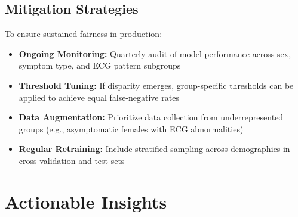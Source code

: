 \documentclass[12pt,a4paper]{article}
\begin{document}
\subsection{Mitigation Strategies}

To ensure sustained fairness in production:

\begin{itemize}
    \item \textbf{Ongoing Monitoring:} Quarterly audit of model performance across sex, symptom type, and ECG pattern subgroups
    \item \textbf{Threshold Tuning:} If disparity emerges, group-specific thresholds can be applied to achieve equal false-negative rates
    \item \textbf{Data Augmentation:} Prioritize data collection from underrepresented groups (e.g., asymptomatic females with ECG abnormalities)
    \item \textbf{Regular Retraining:} Include stratified sampling across demographics in cross-validation and test sets
\end{itemize}

\section{Actionable Insights}
\end{document}
